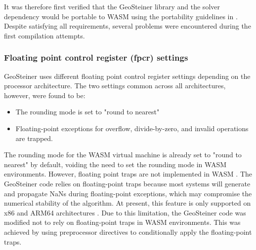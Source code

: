 \documentclass{l4proj}
\begin{document}
It was therefore first verified that the GeoSteiner library and the solver dependency would be portable to WASM using the portability guidelines in \cite{Emscripten_portability}.
Despite satisfying all requirements, several problems were encountered during the first compilation attempts.

\subsubsection{Floating point control register (fpcr) settings}
GeoSteiner uses different floating point control register settings depending on the processor architecture. The two settings common across all architectures, however, were found to be:
\begin{itemize}
    \item The rounding mode is set to "round to nearest"
    \item Floating-point exceptions for overflow, divide-by-zero, and invalid operations are trapped.
\end{itemize}

The rounding mode for the WASM virtual machine is already set to "round to nearest" by default, voiding the need to set the rounding mode in WASM environments. However, floating point traps are not implemented in WASM \citep{WASM_faqs}. The GeoSteiner code relies on floating-point traps because most systems will generate and propagate NaNs during floating-point exceptions, which may compromise the numerical stability of the algorithm. At present, this feature is only supported on x86 and ARM64 architectures \citep{Geosteiner_manual}.
Due to this limitation, the GeoSteiner code was modified not to rely on floating-point traps in WASM environments. This was achieved by using preprocessor directives to conditionally apply the floating-point traps.
\end{document}
